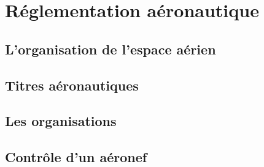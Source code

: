 \section{Réglementation aéronautique}
	\subsection{L'organisation de l'espace aérien}
	
	\subsection{Titres aéronautiques}
	
	\subsection{Les organisations}
	
	\subsection{Contrôle d'un aéronef}